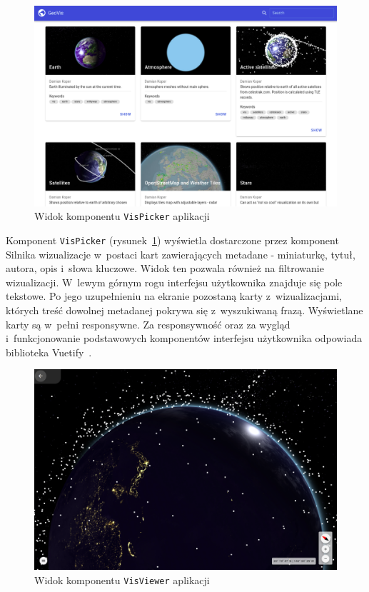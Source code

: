 \begin{figure}[h]
    \centering
    \includegraphics[width=\linewidth]{img/c5_visPicker.png}
    \caption{Widok komponentu \texttt{VisPicker} aplikacji}
    \label{fig:c5_visPicker} 
\end{figure}


Komponent \texttt{VisPicker} (rysunek~\ref{fig:c5_visPicker}) wyświetla dostarczone przez komponent Silnika wizualizacje w~postaci kart zawierających metadane - miniaturkę, tytuł, autora, opis i~słowa kluczowe. Widok ten pozwala również na filtrowanie wizualizacji. W~lewym górnym rogu interfejsu użytkownika znajduje się pole tekstowe. Po jego uzupełnieniu na ekranie pozostaną karty z~wizualizacjami, których treść dowolnej metadanej pokrywa się z~wyszukiwaną frazą. Wyświetlane karty są w~pełni responsywne. Za responsywność oraz za wygląd i~funkcjonowanie podstawowych komponentów interfejsu użytkownika odpowiada biblioteka Vuetify~\cite{Vuetify}.

\begin{figure}[h]
\centering
\includegraphics[width=\linewidth]{img/c5_visViewer.png}
    \caption{Widok komponentu \texttt{VisViewer} aplikacji}
    \label{fig:c5_visViewer} 
\end{figure}

